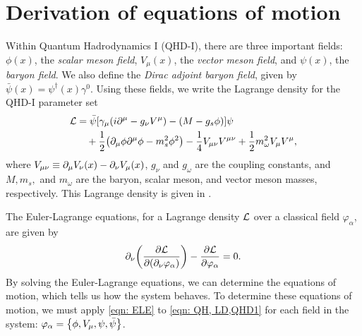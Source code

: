 \section{Derivation of equations of motion}


Within Quantum Hadrodynamics I (QHD-I), there are three important fields: $\phi(x)$, the \textit{scalar meson field}, $V_\mu(x)$, the \textit{vector meson field}, and $\psi(x)$, the \textit{baryon field}. We also define the \textit{Dirac adjoint baryon field}, given by $\bar\psi(x) = \psi^\dagger(x) \gamma^0$. Using these fields, we write the Lagrange density for the QHD-I parameter set
\begin{align} \label{eqn: QH, LD,QHD1}
    \Lag & = \bar{\psi} \bqty{\gamma_\mu(i\p^\mu -g_\nu V^\mu) - (M-g_s\phi)} \psi \nonumber\\
    & \quad + \frac{1}{2} \pqty{\p_\mu \phi \p^\mu \phi - m_s^2 \phi^2} - \frac{1}{4} V_{\mu\nu}V^{\mu\nu} + \frac{1}{2} m_\omega^2 V_\mu V^\mu,
\end{align}
where $V_{\mu\nu}\equiv\partial_\mu V_\nu (x) - \partial_\nu V_\mu(x)$, $g_\nu$ and $g_\omega$ are the coupling constants, and $M, m_s,$ and $m_\omega$ are the baryon, scalar meson, and vector meson masses, respectively. This Lagrange density is given in \autocite[p. 56]{diener_2008}.

The Euler-Lagrange equations, for a Lagrange density $\mathcal{L}$ over a classical field $\varphi_\alpha$, are given by
\begin{align}\label{eqn: ELE}
    \partial_\nu\qty(\pdv{\mathcal{L}}{(\partial_\nu \varphi_\alpha)}) - \pdv{\mathcal{L}}{\varphi_\alpha} = 0.
\end{align}
By solving the Euler-Lagrange equations, we can determine the equations of motion, which tells us how the system behaves. To determine these equations of motion, we must apply \eqref{eqn: ELE} to \eqref{eqn: QH, LD,QHD1} for each field in the system: $\varphi_\alpha = \Bqty{\phi, V_\mu, \psi, \bar\psi}$.

